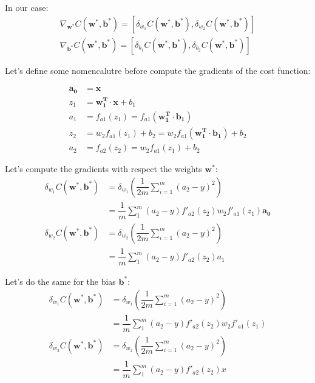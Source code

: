 \documentclass{article}
\begin{document}
In our case:
\begin{align}
  \nabla_{\mathbf{w^*}}C(\mathbf{w^*}, \mathbf{b^*}) = [\delta_{w_1} C(\mathbf{w^*}, \mathbf{b^*}), \delta_{w_2} C(\mathbf{w^*}, \mathbf{b^*})]  \\
  \nabla_{\mathbf{b^*}}C(\mathbf{w^*}, \mathbf{b^*}) = [\delta_{b_1} C(\mathbf{w^*}, \mathbf{b^*}), \delta_{b_2} C(\mathbf{w^*}, \mathbf{b^*})]
\end{align}

Let's define some nomencalutre before compute the gradients of the cost function:

\begin{align}
  \mathbf{a_0} &= \mathbf{x} \\ 
  z_1 &= \mathbf{w_1^T} \cdot \mathbf{x} + b_1 \\
  a_1 &= f_{a1}(z_1) = f_{a1}(\mathbf{w_1^T} \cdot \mathbf{b_1}) \\
  z_2 &= w_2 f_{a1}(z_1) + b_2 = w_2 f_{a1}(\mathbf{w_1^T} \cdot \mathbf{b_1}) + b_2 \\
  a_2 &= f_{a2}(z_2) = w_2 f_{a1}(z_1) + b_2
\end{align}

Let's compute the gradients with respect the weights $\mathbf{w^*}$:
\begin{align}
  \delta_{w_1} C(\mathbf{w^*}, \mathbf{b^*}) &= \delta_{w_1} ( \dfrac{1}{2m} \sum_{i=1}^m (a_2 - y)^2) \nonumber \\
  &= \dfrac{1}{m} \sum_1^m (a_2 - y) f'_{a2}(z_2) w_2 f'_{a1}(z_1) \mathbf{a_0} \\
  \delta_{w_2} C(\mathbf{w^*}, \mathbf{b^*}) &= \delta_{w_2} ( \dfrac{1}{2m} \sum_{i=1}^m (a_2 - y)^2) \nonumber \\
  &= \dfrac{1}{m} \sum_1^m (a_2 - y) f'_{a2}(z_2) a_1 
\end{align}

Let's do the same for the bias $\mathbf{b^*}$:
\begin{align}
  \delta_{w_1} C(\mathbf{w^*}, \mathbf{b^*}) &= \delta_{w_1} ( \dfrac{1}{2m} \sum_{i=1}^m (a_2 - y)^2) \nonumber \\
  &= \dfrac{1}{m} \sum_1^m (a_2 - y) f'_{a2}(z_2) w_2 f'_{a1}(z_1) \\
  \delta_{w_2} C(\mathbf{w^*}, \mathbf{b^*}) &= \delta_{w_2} ( \dfrac{1}{2m} \sum_{i=1}^m (a_2 - y)^2) \nonumber \\
  &= \dfrac{1}{m} \sum_1^m (a_2 - y) f'_{a2}(z_2)x
\end{align}
\end{document}
